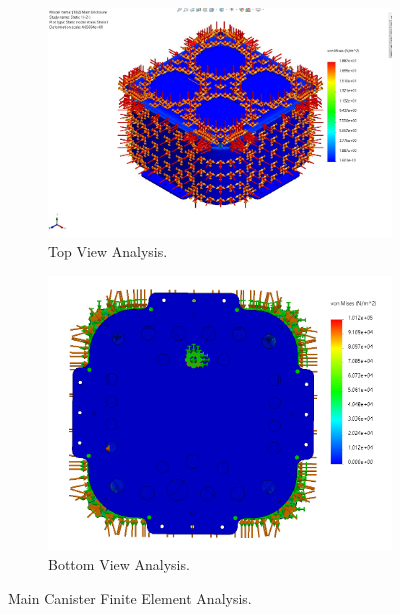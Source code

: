 \begin{figure}[h]
    \centering
    \begin{subfigure}[b]{0.49\columnwidth}
        \includegraphics[width=\textwidth]{Sections/2Design Rationale/images/Top view fig stress.jpg}
        \caption{Top View Analysis.}
        \label{fig:top_fda}
    \end{subfigure}
    \hfill
    \begin{subfigure}[b]{0.49\columnwidth}
        \includegraphics[width=\textwidth]{Sections/2Design Rationale/images/bottom view fig stress.png}
        \caption{Bottom View Analysis.}
        \label{fig:bottom_fda}
    \end{subfigure}
    \caption{Main Canister Finite Element Analysis.}
    \label{fig:fda}
\end{figure}

